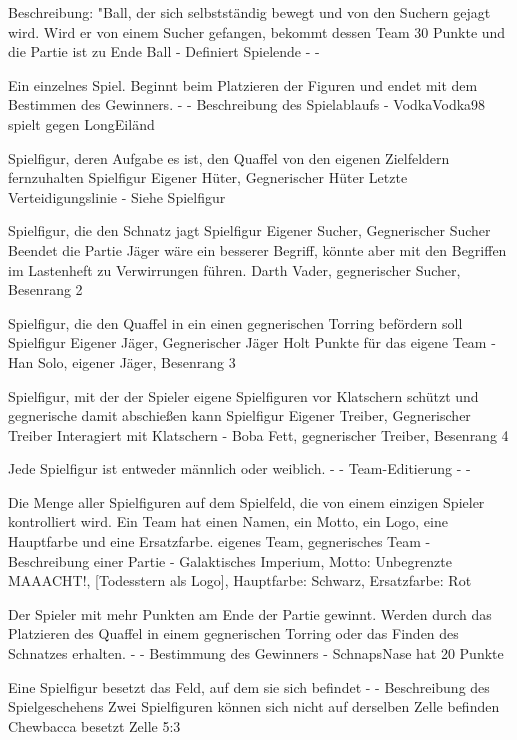 {Beschreibung: "Ball, der sich selbstständig bewegt und von den Suchern gejagt wird. Wird er von einem Sucher gefangen, bekommt dessen Team 30 Punkte und die Partie ist zu Ende}
{Ball}
{-}
{Definiert Spielende}
{-}
{-}

{Ein einzelnes Spiel. Beginnt beim Platzieren der Figuren und endet mit dem Bestimmen des Gewinners.}
{-}
{-}
{Beschreibung des Spielablaufs}
{-}
{VodkaVodka98 spielt gegen LongEiländ}

{Spielfigur, deren Aufgabe es ist, den Quaffel von den eigenen Zielfeldern fernzuhalten}
{Spielfigur}
{Eigener Hüter, Gegnerischer Hüter}
{Letzte Verteidigungslinie}
{-}
{Siehe \glqq{}Spielfigur\grqq{} }

{Spielfigur, die den Schnatz jagt}
{Spielfigur}
{Eigener Sucher, Gegnerischer Sucher}
{Beendet die Partie}
{\glqq{}Jäger\grqq{}  wäre ein besserer Begriff, könnte aber mit den Begriffen im Lastenheft zu Verwirrungen führen.}
{Darth Vader, gegnerischer Sucher, Besenrang 2}

{Spielfigur, die den Quaffel in ein einen gegnerischen Torring befördern soll}
{Spielfigur}
{Eigener Jäger, Gegnerischer Jäger}
{Holt Punkte für das eigene Team}
{-}
{Han Solo, eigener Jäger, Besenrang 3}

{Spielfigur, mit der der Spieler eigene Spielfiguren vor Klatschern schützt und gegnerische damit abschießen kann}
{Spielfigur}
{Eigener Treiber, Gegnerischer Treiber}
{Interagiert mit Klatschern}
{-}
{Boba Fett, gegnerischer Treiber, Besenrang 4}

{Jede Spielfigur ist entweder männlich oder weiblich.}
{-}
{-}
{Team-Editierung}
{-}
{-}

{Die Menge aller Spielfiguren auf dem Spielfeld, die von einem einzigen Spieler kontrolliert wird. Ein Team hat einen Namen, ein Motto, ein Logo, eine Hauptfarbe und eine Ersatzfarbe.}
{eigenes Team, gegnerisches Team}
{-}
{Beschreibung einer Partie}
{-}
{Galaktisches Imperium, Motto: \glqq{}Unbegrenzte MAAACHT!\grqq{}, [Todesstern als Logo], Hauptfarbe: Schwarz, Ersatzfarbe: Rot }

{Der Spieler mit mehr Punkten am Ende der Partie gewinnt. Werden durch das Platzieren des Quaffel in einem gegnerischen Torring oder das Finden des Schnatzes erhalten.}
{-}
{-}
{Bestimmung des Gewinners}
{-}
{SchnapsNase hat 20 Punkte}

{Eine Spielfigur besetzt das Feld, auf dem sie sich befindet}
{-}
{-}
{Beschreibung des Spielgeschehens}
{Zwei Spielfiguren können sich nicht auf derselben Zelle befinden}
{Chewbacca besetzt Zelle 5:3}

